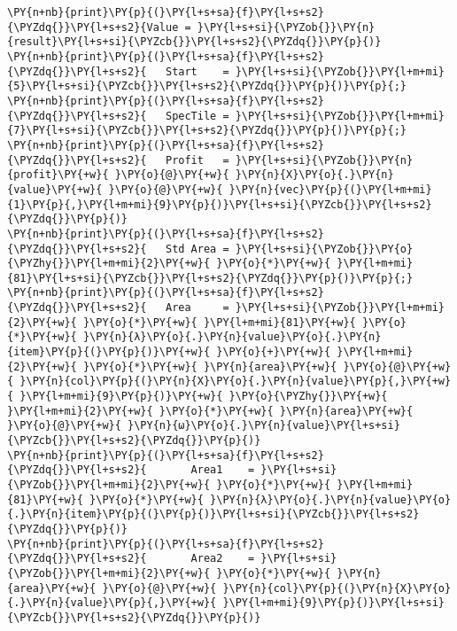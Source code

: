 \begin{tcolorbox}[breakable, size=fbox, boxrule=1pt, pad at break*=1mm,colback=cellbackground, colframe=cellborder]
    \begin{Verbatim}[commandchars=\\\{\}]
\PY{n+nb}{print}\PY{p}{(}\PY{l+s+sa}{f}\PY{l+s+s2}{\PYZdq{}}\PY{l+s+s2}{Value = }\PY{l+s+si}{\PYZob{}}\PY{n}{result}\PY{l+s+si}{\PYZcb{}}\PY{l+s+s2}{\PYZdq{}}\PY{p}{)}
\PY{n+nb}{print}\PY{p}{(}\PY{l+s+sa}{f}\PY{l+s+s2}{\PYZdq{}}\PY{l+s+s2}{   Start    = }\PY{l+s+si}{\PYZob{}}\PY{l+m+mi}{5}\PY{l+s+si}{\PYZcb{}}\PY{l+s+s2}{\PYZdq{}}\PY{p}{)}\PY{p}{;}
\PY{n+nb}{print}\PY{p}{(}\PY{l+s+sa}{f}\PY{l+s+s2}{\PYZdq{}}\PY{l+s+s2}{   SpecTile = }\PY{l+s+si}{\PYZob{}}\PY{l+m+mi}{7}\PY{l+s+si}{\PYZcb{}}\PY{l+s+s2}{\PYZdq{}}\PY{p}{)}\PY{p}{;}
\PY{n+nb}{print}\PY{p}{(}\PY{l+s+sa}{f}\PY{l+s+s2}{\PYZdq{}}\PY{l+s+s2}{   Profit   = }\PY{l+s+si}{\PYZob{}}\PY{n}{profit}\PY{+w}{ }\PY{o}{@}\PY{+w}{ }\PY{n}{X}\PY{o}{.}\PY{n}{value}\PY{+w}{ }\PY{o}{@}\PY{+w}{ }\PY{n}{vec}\PY{p}{(}\PY{l+m+mi}{1}\PY{p}{,}\PY{l+m+mi}{9}\PY{p}{)}\PY{l+s+si}{\PYZcb{}}\PY{l+s+s2}{\PYZdq{}}\PY{p}{)}
\PY{n+nb}{print}\PY{p}{(}\PY{l+s+sa}{f}\PY{l+s+s2}{\PYZdq{}}\PY{l+s+s2}{   Std Area = }\PY{l+s+si}{\PYZob{}}\PY{o}{\PYZhy{}}\PY{l+m+mi}{2}\PY{+w}{ }\PY{o}{*}\PY{+w}{ }\PY{l+m+mi}{81}\PY{l+s+si}{\PYZcb{}}\PY{l+s+s2}{\PYZdq{}}\PY{p}{)}\PY{p}{;}
\PY{n+nb}{print}\PY{p}{(}\PY{l+s+sa}{f}\PY{l+s+s2}{\PYZdq{}}\PY{l+s+s2}{   Area     = }\PY{l+s+si}{\PYZob{}}\PY{l+m+mi}{2}\PY{+w}{ }\PY{o}{*}\PY{+w}{ }\PY{l+m+mi}{81}\PY{+w}{ }\PY{o}{*}\PY{+w}{ }\PY{n}{λ}\PY{o}{.}\PY{n}{value}\PY{o}{.}\PY{n}{item}\PY{p}{(}\PY{p}{)}\PY{+w}{ }\PY{o}{+}\PY{+w}{ }\PY{l+m+mi}{2}\PY{+w}{ }\PY{o}{*}\PY{+w}{ }\PY{n}{area}\PY{+w}{ }\PY{o}{@}\PY{+w}{ }\PY{n}{col}\PY{p}{(}\PY{n}{X}\PY{o}{.}\PY{n}{value}\PY{p}{,}\PY{+w}{ }\PY{l+m+mi}{9}\PY{p}{)}\PY{+w}{ }\PY{o}{\PYZhy{}}\PY{+w}{ }\PY{l+m+mi}{2}\PY{+w}{ }\PY{o}{*}\PY{+w}{ }\PY{n}{area}\PY{+w}{ }\PY{o}{@}\PY{+w}{ }\PY{n}{ω}\PY{o}{.}\PY{n}{value}\PY{l+s+si}{\PYZcb{}}\PY{l+s+s2}{\PYZdq{}}\PY{p}{)}
\PY{n+nb}{print}\PY{p}{(}\PY{l+s+sa}{f}\PY{l+s+s2}{\PYZdq{}}\PY{l+s+s2}{       Area1    = }\PY{l+s+si}{\PYZob{}}\PY{l+m+mi}{2}\PY{+w}{ }\PY{o}{*}\PY{+w}{ }\PY{l+m+mi}{81}\PY{+w}{ }\PY{o}{*}\PY{+w}{ }\PY{n}{λ}\PY{o}{.}\PY{n}{value}\PY{o}{.}\PY{n}{item}\PY{p}{(}\PY{p}{)}\PY{l+s+si}{\PYZcb{}}\PY{l+s+s2}{\PYZdq{}}\PY{p}{)}
\PY{n+nb}{print}\PY{p}{(}\PY{l+s+sa}{f}\PY{l+s+s2}{\PYZdq{}}\PY{l+s+s2}{       Area2    = }\PY{l+s+si}{\PYZob{}}\PY{l+m+mi}{2}\PY{+w}{ }\PY{o}{*}\PY{+w}{ }\PY{n}{area}\PY{+w}{ }\PY{o}{@}\PY{+w}{ }\PY{n}{col}\PY{p}{(}\PY{n}{X}\PY{o}{.}\PY{n}{value}\PY{p}{,}\PY{+w}{ }\PY{l+m+mi}{9}\PY{p}{)}\PY{l+s+si}{\PYZcb{}}\PY{l+s+s2}{\PYZdq{}}\PY{p}{)}

\end{Verbatim}
\end{tcolorbox}
